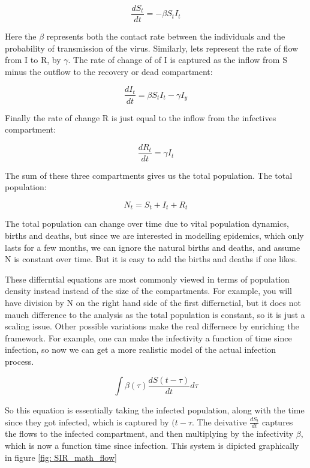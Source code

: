 \documentclass[fontsize=17pt]{article}
\begin{document}
\begin{equation}
	\frac{dS_{t}}{dt}=-\beta S_{t}I_{t}
\end{equation}

Here the $\beta$ represents both the contact rate between the individuals and the probability of transmission of the virus. Similarly, lets represent the rate of flow from I to R, by $\gamma$. The rate of change of of I is captured as the inflow from S minus the outflow to the recovery or dead compartment:

\begin{equation} \label{equ: infected}
\frac{dI_{t}}{dt}=\beta S_{t}I_{t}-\gamma I_{y}
\end{equation}

Finally the rate of change R is just equal to the inflow from the infectives compartment:

\begin{equation}
\frac{dR_{t}}{dt}=\gamma I_{t}
\end{equation}

The sum of these three compartments gives us the total population. The total population:

\begin{equation}
N_{t}=S_{t}+I_{t}+R_{t}
\end{equation}

The total population can change over time due to vital population dynamics, births and deaths, but since we are interested in modelling epidemics, which only lasts for a few months, we can ignore the natural births and deaths, and assume N is constant over time. But it is easy to add the births and deaths if one likes.

These differntial equations are most commonly viewed in terms of population density instead instead of the size of the compartments. For example, you will have division by N on the right hand side of the first differnetial, but it does not mauch difference to the analysis as the total population is constant, so it is just a scaling issue. Other possible variations make the real differnece by enriching the framework. For example, one can make the infectivity a function of time since infection, so now we can get a more realistic model of the actual infection process.

\begin{equation}
\int \beta(\tau)\frac{dS(t-\tau)}{dt}d\tau
\end{equation}


So this equation is essentially taking the infected population, along with the time since they got infected, which is captured by $(t-\tau$. The deivative $\frac{dS_{t}}{dt}$ captures the flows to the infected compartment, and then multiplying by the infectivity $\beta$, which is now a function time since infection. This system is dipicted graphically in figure \ref{fig: SIR_math_flow}
\end{document}
